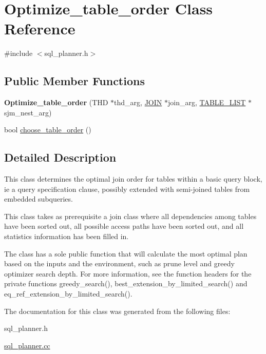 \hypertarget{classOptimize__table__order}{}\section{Optimize\+\_\+table\+\_\+order Class Reference}
\label{classOptimize__table__order}


{\ttfamily \#include $<$sql\+\_\+planner.\+h$>$}

\subsection*{Public Member Functions}
\begin{DoxyCompactItemize}
\item 
\mbox{\label{classOptimize__table__order_a108167d5d39ff1eaf262c4ec13842dc0}} 
{\bfseries Optimize\+\_\+table\+\_\+order} (T\+HD $\ast$thd\+\_\+arg, \mbox{\hyperlink{classJOIN}{J\+O\+IN}} $\ast$join\+\_\+arg, \mbox{\hyperlink{structTABLE__LIST}{T\+A\+B\+L\+E\+\_\+\+L\+I\+ST}} $\ast$sjm\+\_\+nest\+\_\+arg)
\item 
bool \mbox{\hyperlink{group__Query__Planner_gaf585184987b0097465505d600394b8f3}{choose\+\_\+table\+\_\+order}} ()
\end{DoxyCompactItemize}


\subsection{Detailed Description}
This class determines the optimal join order for tables within a basic query block, ie a query specification clause, possibly extended with semi-\/joined tables from embedded subqueries.

This class takes as prerequisite a join class where all dependencies among tables have been sorted out, all possible access paths have been sorted out, and all statistics information has been filled in.

The class has a sole public function that will calculate the most optimal plan based on the inputs and the environment, such as prune level and greedy optimizer search depth. For more information, see the function headers for the private functions greedy\+\_\+search(), best\+\_\+extension\+\_\+by\+\_\+limited\+\_\+search() and eq\+\_\+ref\+\_\+extension\+\_\+by\+\_\+limited\+\_\+search(). 

The documentation for this class was generated from the following files\+:\begin{DoxyCompactItemize}
\item 
sql\+\_\+planner.\+h\item 
\mbox{\hyperlink{sql__planner_8cc}{sql\+\_\+planner.\+cc}}\end{DoxyCompactItemize}
